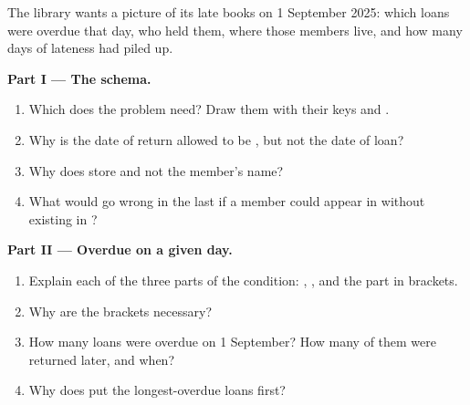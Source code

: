 \begin{problem}\label{pb:g12:relational-databases-sql:1}
The library wants a picture of its late books on 1 September 2025: which loans were overdue that day, who held them,
where those members live, and how many days of lateness had piled up.

\label{lst:g12:relational-databases-sql:overdue}

\label{out:g12:relational-databases-sql:overdue}

\label{out:g12:relational-databases-sql:overdue-2}

\medskip\noindent\textbf{Part I --- The schema.}
\begin{enumerate}
  \item Which  does the problem need? Draw them with their keys and .
  \item Why is the date of return allowed to be , but not the date of loan?
  \item Why does  store  and not the member's name?
  \item What would go wrong in the last  if a member could appear in  without existing in
    ?
\end{enumerate}

\medskip\noindent\textbf{Part II --- Overdue on a given day.}
\begin{enumerate}[resume]
  \item Explain each of the three parts of the condition: , , and the part in
    brackets.
  \item Why are the brackets necessary?
  \item How many loans were overdue on 1 September? How many of them were returned later, and when?
  \item Why does  put the longest-overdue loans first?
\end{enumerate}


\end{problem}
